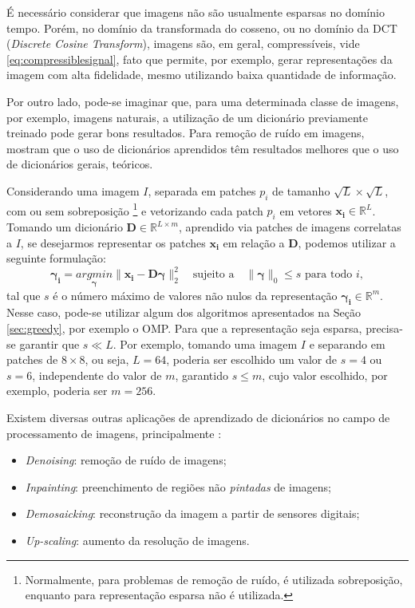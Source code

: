 \documentclass[cic,tc]{iiufrgs}
\renewcommand{\vec}[1]{\bm{#1}}
\newcommand{\mat}[1]{\bm{#1}}
\begin{document}
É necessário considerar que imagens não são usualmente esparsas no domínio tempo.
Porém, no domínio da transformada do cosseno, ou no domínio da DCT (\textit{Discrete Cosine Transform}), 
imagens são, em geral, compressíveis, vide \eqref{eq:compressiblesignal}, fato 
que permite, por exemplo, gerar representações da imagem com alta fidelidade, mesmo
utilizando baixa quantidade de informação.

Por outro lado, pode-se imaginar que, para uma determinada classe de imagens,
por exemplo, imagens naturais, a utilização de um dicionário previamente treinado 
pode gerar bons resultados. Para remoção de ruído em imagens, \citet{EladDenoising} 
mostram que o uso de dicionários aprendidos têm resultados melhores que o uso de 
dicionários gerais, teóricos.

Considerando uma imagem $I$, separada em patches $p_i$ de tamanho $\sqrt{L}\times\sqrt{L}$, 
com ou sem sobreposição
\footnote{Normalmente, para problemas de remoção de ruído, é utilizada sobreposição,
enquanto para representação esparsa não é utilizada.}
e vetorizando cada patch $p_i$ em vetores
$\vec{x_i} \in \mathbb{R}^L$. 
Tomando um dicionário $\mat{D} \in \mathbb{R}^{L\times m}$, 
aprendido via patches de imagens correlatas a $I$, se desejarmos representar os patches 
$\vec{x_i}$ em relação a $\mat{D}$, podemos utilizar a seguinte formulação:
\begin{equation}
    \label{eq:patchcoding}
    \vec{\gamma_i} = \underset{\vec{\gamma}}{argmin} \lVert \vec{x_i} - \mat{D}\vec{\gamma} \rVert_2^2
    \hspace{1em} \text{sujeito a} \hspace{1em}
    \lVert \vec{\gamma} \rVert_0 \le s
    \text{ para todo } i,
\end{equation}
tal que $s$ é o número máximo de valores não nulos da representação $\vec{\gamma_i} \in \mathbb{R}^m$.
Nesse caso, pode-se utilizar algum dos algoritmos apresentados na
Seção \ref{sec:greedy}, por exemplo o OMP. 
Para que a representação seja esparsa, precisa-se garantir que $s \ll L$.
Por exemplo, tomando uma imagem $I$ e separando em patches de $8\times 8$, ou seja,
$L = 64$, poderia ser escolhido um valor de $s = 4$ ou $s=6$, independente do valor 
de $m$, garantido $s \le m$, cujo valor escolhido, por exemplo, poderia ser $m = 256$.

Existem diversas outras aplicações de aprendizado de dicionários no campo de processamento de
imagens, principalmente \cite{MairalSparse}:
\begin{itemize}
    \item \textit{Denoising}: remoção de ruído de imagens;
    \item \textit{Inpainting}: preenchimento de regiões não \textit{pintadas} de imagens;
    \item \textit{Demosaicking}: reconstrução da imagem a partir de sensores digitais;
    \item \textit{Up-scaling}: aumento da resolução de imagens.
\end{itemize}
\end{document}
